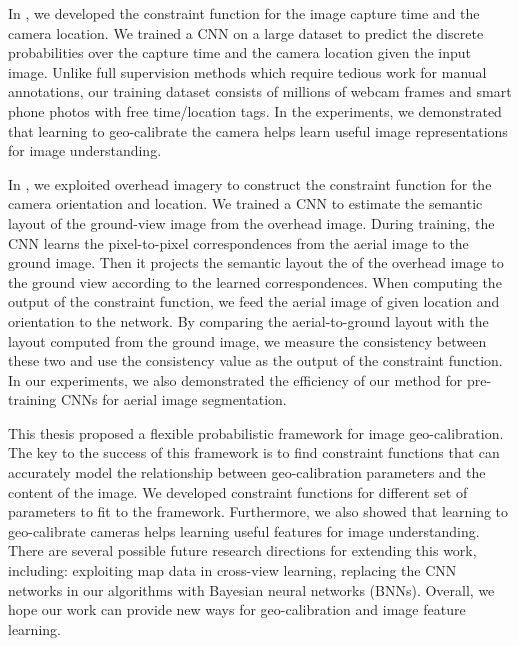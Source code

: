 In , we developed the constraint function for 
the image capture time and the camera location. 
We trained a CNN on a large dataset to predict the discrete
probabilities over the capture time and the camera location given the
input image.
Unlike full supervision methods which require tedious work for manual
annotations, our training dataset consists of millions of webcam
frames and smart phone photos with free time/location tags.
In the experiments, we demonstrated that learning to geo-calibrate the
camera helps learn useful image representations for image understanding.

In , we exploited overhead imagery to construct
the constraint function for the camera orientation and location.
We trained a CNN to estimate the semantic layout of the
ground-view image from the overhead image. During training, the CNN
learns the pixel-to-pixel correspondences from the aerial image to the
ground image. Then it projects the semantic layout the of the overhead
image to the ground view according to the learned correspondences.
When computing the output of the constraint function, we feed the
aerial image of given location and orientation to the network. By
comparing the aerial-to-ground layout with the layout computed from
the ground image, we measure the consistency between these two and use
the consistency value as the output of the constraint function. 
In our experiments, we also demonstrated the efficiency of our method
for pre-training CNNs for aerial image segmentation.

This thesis proposed a flexible probabilistic framework for image
geo-calibration. The key to the success of this framework is to find
constraint functions that can accurately model the relationship between
geo-calibration parameters and the content of the image. 
We developed constraint functions for different set of parameters to
fit to the framework. 
Furthermore, we also showed that learning to geo-calibrate cameras helps
learning useful features for image understanding. There are several
possible future research directions for extending this work,
including: exploiting map data in cross-view learning, replacing the
CNN networks in our algorithms with Bayesian neural networks (BNNs).
Overall, we hope our work can provide new ways for geo-calibration and
image feature learning.
